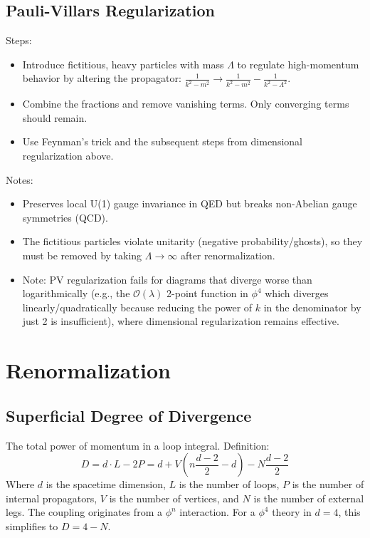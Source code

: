 \documentclass{article}
\begin{document}
\subsection{Pauli-Villars Regularization}
Steps:
\begin{itemize}
    \item Introduce fictitious, heavy particles with mass $\Lambda$ to regulate high-momentum behavior by altering the propagator: $\frac{1}{k^2 - m^2} \to \frac{1}{k^2 - m^2} - \frac{1}{k^2 - \Lambda^2}$.
    \item Combine the fractions and remove vanishing terms. Only converging terms should remain.
    \item Use Feynman's trick and the subsequent steps from dimensional regularization above.
\end{itemize}
Notes:
\begin{itemize}
    \item Preserves local U(1) gauge invariance in QED but breaks non-Abelian gauge symmetries (QCD).
    \item The fictitious particles violate unitarity (negative probability/ghosts), so they must be removed by taking $\Lambda \to \infty$ after renormalization.
    \item Note: PV regularization fails for diagrams that diverge worse than logarithmically (e.g., the $\mathcal{O}(\lambda)$ 2-point function in $\phi^4$ which diverges linearly/quadratically because reducing the power of $k$ in the denominator by just 2 is insufficient), where dimensional regularization remains effective.
\end{itemize}
\newpage
\section{Renormalization}
\subsection{Superficial Degree of Divergence}
The total power of momentum in a loop integral.
Definition:
\begin{equation}
    D = d \cdot L - 2P = d + V\left(n \frac{d-2}{2} - d\right) - N \frac{d-2}{2}
\end{equation}
Where $d$ is the spacetime dimension, $L$ is the number of loops, $P$ is the number of internal propagators, $V$ is the number of vertices, and $N$ is the number of external legs. The coupling originates from a $\phi^n$ interaction. For a $\phi^4$ theory in $d=4$, this simplifies to $D = 4 - N$.
\end{document}
